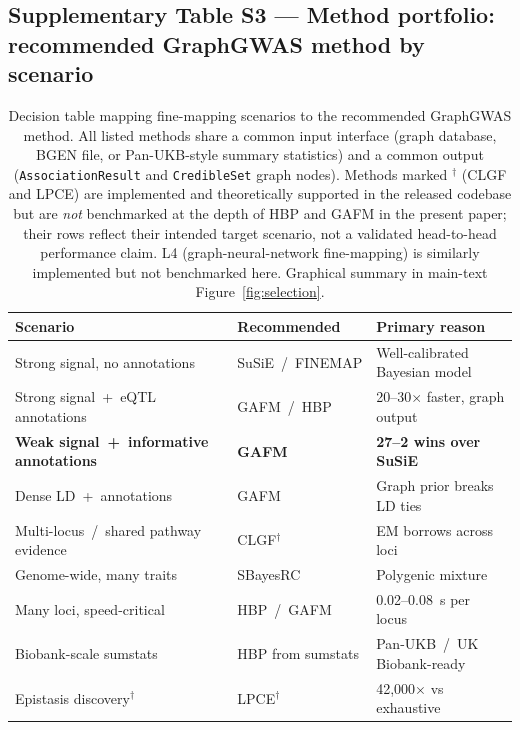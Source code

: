 \clearpage

\subsection*{Supplementary Table S3 --- Method portfolio: recommended GraphGWAS method by scenario}

\begin{table}[htbp]
\centering
\small
\begin{tabular}{p{}ll}
\toprule
Scenario & Recommended & Primary reason \\
\midrule
Strong signal, no annotations & SuSiE~/~FINEMAP & Well-calibrated Bayesian model \\
Strong signal~+~eQTL annotations & GAFM~/~HBP & 20--30$\times$ faster, graph output \\
\textbf{Weak signal~+~informative annotations} & \textbf{GAFM} & \textbf{27--2 wins over SuSiE} \\
Dense LD~+~annotations & GAFM & Graph prior breaks LD ties \\
Multi-locus~/~shared pathway evidence & CLGF$^{\dagger}$ & EM borrows across loci \\
Genome-wide, many traits & SBayesRC & Polygenic mixture \\
Many loci, speed-critical & HBP~/~GAFM & 0.02--0.08~s per locus \\
Biobank-scale sumstats & HBP from sumstats & Pan-UKB~/~UK Biobank-ready \\
Epistasis discovery$^{\dagger}$ & LPCE$^{\dagger}$ & 42{,}000$\times$ vs exhaustive \\
\bottomrule
\end{tabular}
\caption{Decision table mapping fine-mapping scenarios to the
recommended GraphGWAS method. All listed methods share a common
input interface (graph database, BGEN file, or Pan-UKB-style summary
statistics) and a common output (\texttt{AssociationResult} and
\texttt{CredibleSet} graph nodes). Methods marked $^{\dagger}$
(CLGF and LPCE) are implemented and theoretically supported in the
released codebase but are \emph{not} benchmarked at the depth of
HBP and GAFM in the present paper; their rows reflect their intended
target scenario, not a validated head-to-head performance claim.
L4 (graph-neural-network fine-mapping) is similarly implemented
but not benchmarked here. Graphical summary in main-text
Figure~\ref{fig:selection}.}
\label{tab:sup_portfolio}
\end{table}

\clearpage

